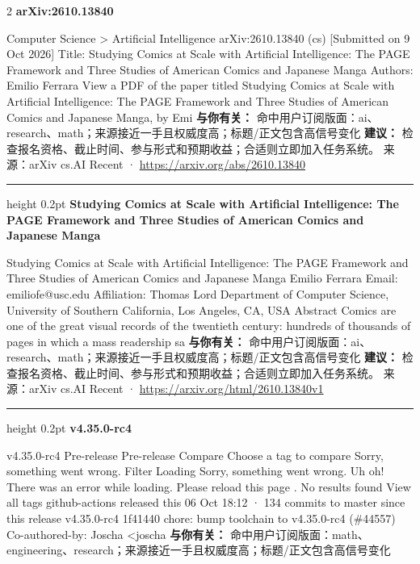 \documentclass[10.5pt]{ctexart}
\begin{document}
\begin{multicols}{2}
{\large\bfseries arXiv:2610.13840}\par
Computer Science > Artificial Intelligence arXiv:2610.13840 (cs) [Submitted on 9 Oct 2026] Title: Studying Comics at Scale with Artificial Intelligence: The PAGE Framework and Three Studies of American Comics and Japanese Manga Authors: Emilio Ferrara View a PDF of the paper titled Studying Comics at Scale with Artificial Intelligence: The PAGE Framework and Three Studies of American Comics and Japanese Manga, by Emi
\textbf{与你有关：} 命中用户订阅版面：ai、research、math；来源接近一手且权威度高；标题/正文包含高信号变化
\textbf{建议：} 检查报名资格、截止时间、参与形式和预期收益；合适则立即加入任务系统。
{\footnotesize\color{ormuted} 来源：arXiv cs.AI Recent · \url{https://arxiv.org/abs/2610.13840}}
\vspace{2mm}
\hrule height 0.2pt
\vspace{2mm}
{\large\bfseries Studying Comics at Scale with Artificial Intelligence: The PAGE Framework and Three Studies of American Comics and Japanese Manga}\par
Studying Comics at Scale with Artificial Intelligence: The PAGE Framework and Three Studies of American Comics and Japanese Manga Emilio Ferrara Email: emiliofe@usc.edu Affiliation: Thomas Lord Department of Computer Science, University of Southern California, Los Angeles, CA, USA Abstract Comics are one of the great visual records of the twentieth century: hundreds of thousands of pages in which a mass readership sa
\textbf{与你有关：} 命中用户订阅版面：ai、research、math；来源接近一手且权威度高；标题/正文包含高信号变化
\textbf{建议：} 检查报名资格、截止时间、参与形式和预期收益；合适则立即加入任务系统。
{\footnotesize\color{ormuted} 来源：arXiv cs.AI Recent · \url{https://arxiv.org/html/2610.13840v1}}
\vspace{2mm}
\hrule height 0.2pt
\vspace{2mm}
{\large\bfseries v4.35.0-rc4}\par
v4.35.0-rc4 Pre-release Pre-release Compare Choose a tag to compare Sorry, something went wrong. Filter Loading Sorry, something went wrong. Uh oh! There was an error while loading. Please reload this page . No results found View all tags github-actions released this 06 Oct 18:12 · 134 commits to master since this release v4.35.0-rc4 1f41440 chore: bump toolchain to v4.35.0-rc4 (\#44557) Co-authored-by: Joscha <joscha
\textbf{与你有关：} 命中用户订阅版面：math、engineering、research；来源接近一手且权威度高；标题/正文包含高信号变化

\end{multicols}
\end{document}
